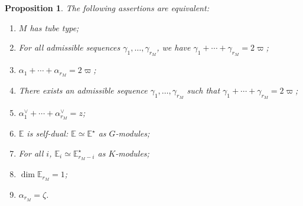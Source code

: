 \documentclass[JEP,XML,SOM,Unicode,NoFloatCountersInSection]{cedram}
\let\oldvee\vee
\renewcommand{\vee}{{\scriptscriptstyle\oldvee}}
\theoremstyle{plain}
\newtheorem{prop}[theo]{Proposition}
\theoremstyle{definition}
\newcommand{\bE}{\mathbb{E}}
\newcommand{\rkm}{{r_M}}
\begin{document}
\begin{prop}
\label{prop:self-dual}
The following assertions are equivalent:
\begin{enumerate}
\item \label{item:tube} $M$ has tube type;
\item \label{item:varpi-forall}
For all admissible sequences $\gamma_1,\ldots,\gamma_\rkm$, we have $\gamma_1+\cdots+\gamma_\rkm = 2 \varpi$;
\item \label{item:varpi-a}
$\alpha_1+\cdots+\alpha_\rkm = 2 \varpi$;
\item \label{item:varpi-exists}
There exists an admissible sequence $\gamma_1,\ldots,\gamma_\rkm$ such that $\gamma_1+\cdots+\gamma_\rkm = 2 \varpi$;
\item \label{item:z}
$\alpha_1^\vee + \cdots + \alpha_\rkm^\vee = z$;
\item \label{item:self-dual}
$\bE$ is self-dual: $\bE \simeq \bE^\star$ as $G$-modules;
\item \label{item:Ei}
For all $i$, $\bE_i \simeq \bE_{\rkm-i}^\star$ as $K$-modules;
\item \label{item:Er}
$\dim \bE_\rkm=1$;
\item \label{item:alpha_r}
$\alpha_\rkm=\zeta$.
\end{enumerate}
\end{prop}
\end{document}
